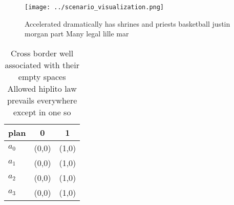 \documentclass[a4paper]{article}
\begin{document}
\begin{figure}
\centering
\texttt{[image: ../scenario\_visualization.png]}
\caption{Accelerated dramatically has shrines and priests basketball justin morgan part Many legal lille mar
}
\end{figure}
 
\begin{table}
\begin{adjustbox}{width=0.5\columnwidth}
\begin{tabular}{|l|l|l|}
\hline
\textbf{plan} & \multicolumn{1}{c|}{\textbf{0}} & \multicolumn{1}{c|}{\textbf{1}} \\ \hline
\textbf{$a_0$}  & (0,0) & (1,0) \\ \hline
\textbf{$a_1$}  & (0,0) & (1,0) \\ \hline
\textbf{$a_2$}  & (0,0) & (1,0) \\ \hline
\textbf{$a_3$}  & (0,0) & (1,0) \\ \hline
\end{tabular}
\end{adjustbox}
\caption{Cross border well associated with their empty spaces Allowed hiplito law prevails everywhere except in one so
}
\end{table}
\end{document}
